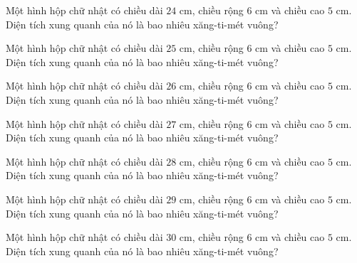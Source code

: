 \begin{ex}
  Một hình hộp chữ nhật có chiều dài $24\text{ cm}$, chiều rộng $6\text{ cm}$ và chiều cao $5\text{ cm}$. Diện tích xung quanh của nó là bao nhiêu xăng-ti-mét vuông?
\end{ex}

\begin{ex}
  Một hình hộp chữ nhật có chiều dài $25\text{ cm}$, chiều rộng $6\text{ cm}$ và chiều cao $5\text{ cm}$. Diện tích xung quanh của nó là bao nhiêu xăng-ti-mét vuông?
\end{ex}

\begin{ex}
  Một hình hộp chữ nhật có chiều dài $26\text{ cm}$, chiều rộng $6\text{ cm}$ và chiều cao $5\text{ cm}$. Diện tích xung quanh của nó là bao nhiêu xăng-ti-mét vuông?
\end{ex}

\begin{ex}
  Một hình hộp chữ nhật có chiều dài $27\text{ cm}$, chiều rộng $6\text{ cm}$ và chiều cao $5\text{ cm}$. Diện tích xung quanh của nó là bao nhiêu xăng-ti-mét vuông?
\end{ex}

\begin{ex}
  Một hình hộp chữ nhật có chiều dài $28\text{ cm}$, chiều rộng $6\text{ cm}$ và chiều cao $5\text{ cm}$. Diện tích xung quanh của nó là bao nhiêu xăng-ti-mét vuông?
\end{ex}

\begin{ex}
  Một hình hộp chữ nhật có chiều dài $29\text{ cm}$, chiều rộng $6\text{ cm}$ và chiều cao $5\text{ cm}$. Diện tích xung quanh của nó là bao nhiêu xăng-ti-mét vuông?
\end{ex}

\begin{ex}
  Một hình hộp chữ nhật có chiều dài $30\text{ cm}$, chiều rộng $6\text{ cm}$ và chiều cao $5\text{ cm}$. Diện tích xung quanh của nó là bao nhiêu xăng-ti-mét vuông?
\end{ex}

